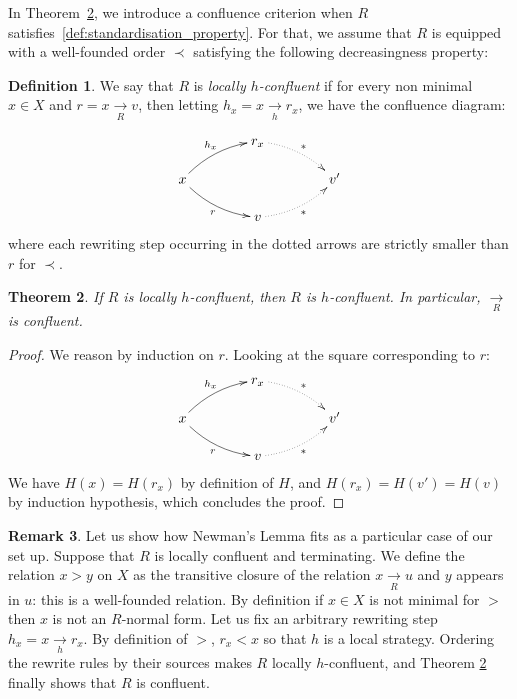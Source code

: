\documentclass[10pt]{easychair}
\newtheorem{theorem}{Theorem}[section]
\theoremstyle{definition}
\newtheorem{definition}[theorem]{Definition}
\newtheorem{remark}[theorem]{Remark}
\newcommand\rewR{\underset{R}{\longrightarrow}}
\newcommand\rewh{\underset{h}{\longrightarrow}}
\begin{document}
In Theorem~\ref{thm:confluence_criterion}, we introduce a confluence
criterion when $R$ satisfies~\ref{def:standardisation_property}. For
that, we assume that $R$ is equipped with a well-founded order $\prec$
satisfying the following decreasingness property:

\begin{definition}\label{proper:decreasingness_property}
  We say that $R$ is \emph{locally $h$-confluent} if for every non
  minimal $x\in X$ and $r=x\rewR v$, then letting $h_x=x\rewh r_x$, we
  have the confluence diagram:
  
  \[
    \xymatrix @C = 4em @R = 1.5em{
      &
      r_x
      \ar@{.>}@/^/ [rd] ^{*}
      & \\
      x
      \ar@/^/ [ru] ^{h_x}
      \ar@/_/ [rd] _{r}
      &
      &
      v'
      \\
      &
      v
      \ar@{.>}@/_/  [ru] _{*}
      &
    }
  \]
  where each rewriting step occurring in the dotted arrows are strictly
  smaller than $r$ for $\prec$.
\end{definition}

\begin{theorem}\label{thm:confluence_criterion}
  If $R$ is locally $h$-confluent, then $R$ is $h$-confluent. In particular, $\rewR$ is confluent.
\end{theorem}

\begin{proof}
 We reason by induction on $r$. Looking at the square corresponding to $r$:
    \[
    \xymatrix @C = 4em @R = 1.5em{
      &
      r_x
      \ar@{.>}@/^/ [rd] ^{*}
      & \\
      x
      \ar@/^/ [ru] ^{h_x}
      \ar@/_/ [rd] _{r}
      &
      &
      v'
      \\
      &
      v
      \ar@{.>}@/_/  [ru] _{*}
      &
    }
  \]
  We have $H(x) = H(r_x)$ by definition of $H$, and $H(r_x) = H(v') = H(v)$ by induction hypothesis, which concludes the proof.
\end{proof}

\begin{remark}
Let us show how Newman's Lemma fits as a particular case of our set up. 
Suppose that $R$ is locally confluent and terminating. We define the relation $x > y$ on $X$ as the transitive closure of the relation $x \rewR u$ and $y$ appears in $u$: this is a well-founded relation. By definition if $x \in X$ is not minimal for $>$ then $x$ is not an $R$-normal form. Let us fix an arbitrary rewriting step $h_x= x \rewh r_x$.  By definition of $>$, $r_x < x$ so that $h$ is a local strategy. Ordering the rewrite rules by their sources makes $R$ locally $h$-confluent, and Theorem \ref{thm:confluence_criterion} finally shows that $R$ is confluent.  
\end{remark}
\end{document}
